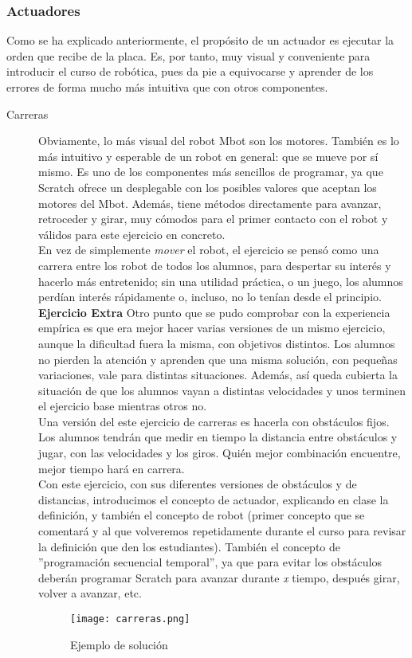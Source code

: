 \subsubsection{Actuadores} \label{subsubsec:actuadores}
 Como se ha explicado anteriormente, el propósito de un actuador es ejecutar la orden que recibe de la placa. Es, por tanto, muy visual y conveniente para introducir el curso de robótica, pues da pie a equivocarse y aprender de los errores de forma mucho más intuitiva que con otros componentes.
 
\begin{description}

\item [Carreras]\label{ej:carreras}
Obviamente, lo más visual del robot Mbot son los motores. También es lo más intuitivo y esperable de un robot en general: que se mueve por sí mismo. Es uno de los componentes más sencillos de programar, ya que Scratch ofrece un desplegable con los posibles valores que aceptan los motores del Mbot. Además, tiene métodos directamente para avanzar, retroceder y girar, muy cómodos para el primer contacto con el robot y válidos para este ejercicio en concreto. \\
En vez de simplemente \textit{mover} el robot, el ejercicio se pensó como una carrera entre los robot de todos los alumnos, para despertar su interés y hacerlo más entretenido; sin una utilidad práctica, o un juego, los alumnos perdían interés rápidamente o, incluso, no lo tenían desde el principio. \\
\textbf{Ejercicio Extra} Otro punto que se pudo comprobar con la experiencia empírica es que era mejor hacer varias versiones de un mismo ejercicio, aunque la dificultad fuera la misma, con objetivos distintos. Los alumnos no pierden la atención y aprenden que una misma solución, con pequeñas variaciones, vale para distintas situaciones. Además, así queda cubierta la situación de que los alumnos vayan a distintas velocidades y unos terminen el ejercicio base mientras otros no.\\
Una versión del este ejercicio de carreras es hacerla con obstáculos fijos. Los alumnos tendrán que medir en tiempo la distancia entre obstáculos y jugar, con las velocidades y los giros. Quién mejor combinación encuentre, mejor tiempo hará en carrera.\\
Con este ejercicio, con sus diferentes versiones de obstáculos y de distancias, introducimos el concepto de actuador, explicando en clase la definición, y también el concepto de robot (primer concepto que se comentará y al que volveremos repetidamente durante el curso para revisar la definición que den los estudiantes). También el concepto de ''programación secuencial temporal'', ya que para evitar los obstáculos deberán programar Scratch para avanzar durante \textit{x} tiempo, después girar, volver a avanzar, etc.
\begin{figure}[h]
	\centering
	\texttt{[image: carreras.png]}
	\label{img:carreras}
	\caption{Ejemplo de solución}
\end{figure}


\end{description}
